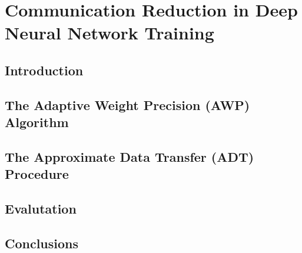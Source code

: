 \chapter{Communication Reduction in Deep Neural Network Training}
\label{chap:bitpack}


\section{Introduction}

\section{The Adaptive Weight Precision (AWP) Algorithm}
\label{sec:bitpack_adaptive}

\section{The Approximate Data Transfer (ADT) Procedure}
\label{sec:bitpack_approx}

\section{Evalutation}
\label{sec:bitpack_evaluation}

\section{Conclusions}
\label{sec:bitpack_conclusion}

